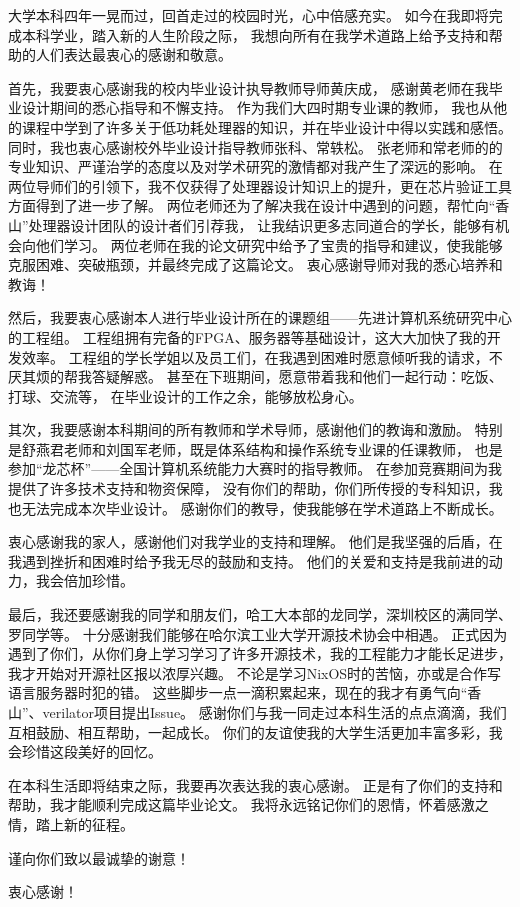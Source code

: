 \begin{acknowledgements}

大学本科四年一晃而过，回首走过的校园时光，心中倍感充实。
如今在我即将完成本科学业，踏入新的人生阶段之际，
我想向所有在我学术道路上给予支持和帮助的人们表达最衷心的感谢和敬意。

首先，我要衷心感谢我的校内毕业设计执导教师导师黄庆成，
感谢黄老师在我毕业设计期间的悉心指导和不懈支持。
作为我们大四时期专业课的教师，
我也从他的课程中学到了许多关于低功耗处理器的知识，并在毕业设计中得以实践和感悟。
同时，我也衷心感谢校外毕业设计指导教师张科、常轶松。
张老师和常老师的的专业知识、严谨治学的态度以及对学术研究的激情都对我产生了深远的影响。
在两位导师们的引领下，我不仅获得了处理器设计知识上的提升，更在芯片验证工具方面得到了进一步了解。
两位老师还为了解决我在设计中遇到的问题，帮忙向“香山”处理器设计团队的设计者们引荐我，
让我结识更多志同道合的学长，能够有机会向他们学习。
两位老师在我的论文研究中给予了宝贵的指导和建议，使我能够克服困难、突破瓶颈，并最终完成了这篇论文。
衷心感谢导师对我的悉心培养和教诲！

然后，我要衷心感谢本人进行毕业设计所在的课题组——先进计算机系统研究中心的工程组。
工程组拥有完备的FPGA、服务器等基础设计，这大大加快了我的开发效率。
工程组的学长学姐以及员工们，在我遇到困难时愿意倾听我的请求，不厌其烦的帮我答疑解惑。
甚至在下班期间，愿意带着我和他们一起行动：吃饭、打球、交流等，
在毕业设计的工作之余，能够放松身心。

其次，我要感谢本科期间的所有教师和学术导师，感谢他们的教诲和激励。
特别是舒燕君老师和刘国军老师，既是体系结构和操作系统专业课的任课教师，
也是参加“龙芯杯”——全国计算机系统能力大赛时的指导教师。
在参加竞赛期间为我提供了许多技术支持和物资保障，
没有你们的帮助，你们所传授的专科知识，我也无法完成本次毕业设计。
感谢你们的教导，使我能够在学术道路上不断成长。

衷心感谢我的家人，感谢他们对我学业的支持和理解。
他们是我坚强的后盾，在我遇到挫折和困难时给予我无尽的鼓励和支持。
他们的关爱和支持是我前进的动力，我会倍加珍惜。

最后，我还要感谢我的同学和朋友们，哈工大本部的龙同学，深圳校区的满同学、罗同学等。
十分感谢我们能够在哈尔滨工业大学开源技术协会中相遇。
正式因为遇到了你们，从你们身上学习学习了许多开源技术，我的工程能力才能长足进步，我才开始对开源社区报以浓厚兴趣。
不论是学习NixOS时的苦恼，亦或是合作写语言服务器时犯的错。
这些脚步一点一滴积累起来，现在的我才有勇气向“香山”、verilator项目提出Issue。
感谢你们与我一同走过本科生活的点点滴滴，我们互相鼓励、相互帮助，一起成长。
你们的友谊使我的大学生活更加丰富多彩，我会珍惜这段美好的回忆。

在本科生活即将结束之际，我要再次表达我的衷心感谢。
正是有了你们的支持和帮助，我才能顺利完成这篇毕业论文。
我将永远铭记你们的恩情，怀着感激之情，踏上新的征程。

谨向你们致以最诚挚的谢意！

衷心感谢！

\end{acknowledgements}
